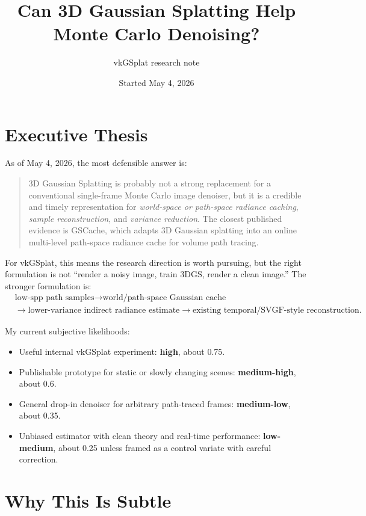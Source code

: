 \documentclass[11pt]{article}
\title{Can 3D Gaussian Splatting Help Monte Carlo Denoising?}
\author{vkGSplat research note}
\date{Started May 4, 2026}
\begin{document}
\maketitle

\section{Executive Thesis}

As of May 4, 2026, the most defensible answer is:

\begin{quote}
3D Gaussian Splatting is probably not a strong replacement for a conventional
single-frame Monte Carlo image denoiser, but it is a credible and timely
representation for \emph{world-space or path-space radiance caching},
\emph{sample reconstruction}, and \emph{variance reduction}. The closest
published evidence is GSCache, which adapts 3D Gaussian splatting into an
online multi-level path-space radiance cache for volume path tracing.
\end{quote}

For vkGSplat, this means the research direction is worth pursuing, but the
right formulation is not ``render a noisy image, train 3DGS, render a clean
image.'' The stronger formulation is:
\[
  \begin{aligned}
  &\text{low-spp path samples}
  \rightarrow
  \text{world/path-space Gaussian cache}
  \\
  &\rightarrow
  \text{lower-variance indirect radiance estimate}
  \rightarrow
  \text{existing temporal/SVGF-style reconstruction}.
  \end{aligned}
\]

My current subjective likelihoods:

\begin{itemize}
  \item Useful internal vkGSplat experiment: \textbf{high}, about 0.75.
  \item Publishable prototype for static or slowly changing scenes: \textbf{medium-high}, about 0.6.
  \item General drop-in denoiser for arbitrary path-traced frames: \textbf{medium-low}, about 0.35.
  \item Unbiased estimator with clean theory and real-time performance: \textbf{low-medium}, about 0.25 unless framed as a control variate with careful correction.
\end{itemize}

\section{Why This Is Subtle}
\end{document}
